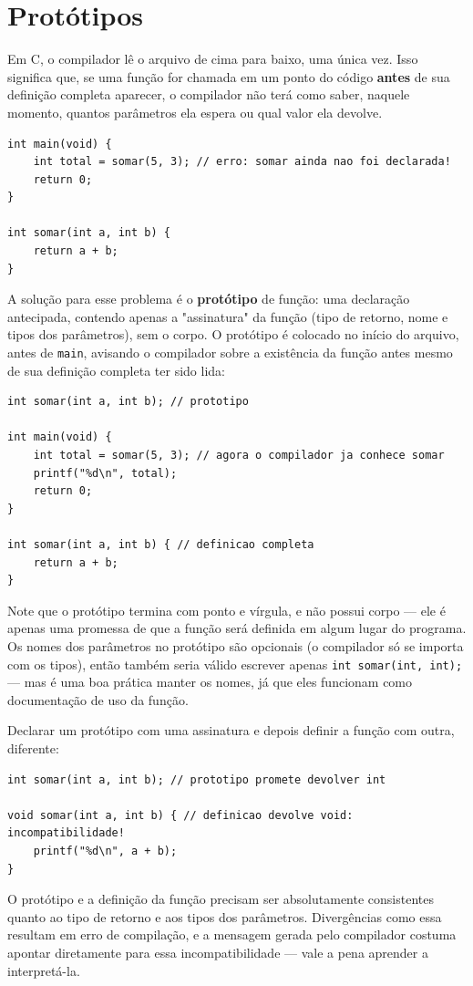 \documentclass[12pt,a4paper,oneside]{extreport}
\begin{document}
\section{Protótipos}

Em C, o compilador lê o arquivo de cima para baixo, uma única vez. Isso significa que, se uma função for chamada em um ponto do código \textbf{antes} de sua definição completa aparecer, o compilador não terá como saber, naquele momento, quantos parâmetros ela espera ou qual valor ela devolve.

\begin{lstlisting}
int main(void) {
    int total = somar(5, 3); // erro: somar ainda nao foi declarada!
    return 0;
}

int somar(int a, int b) {
    return a + b;
}
\end{lstlisting}

A solução para esse problema é o \textbf{protótipo} de função: uma declaração antecipada, contendo apenas a "assinatura" da função (tipo de retorno, nome e tipos dos parâmetros), sem o corpo. O protótipo é colocado no início do arquivo, antes de \texttt{main}, avisando o compilador sobre a existência da função antes mesmo de sua definição completa ter sido lida:

\begin{lstlisting}
int somar(int a, int b); // prototipo

int main(void) {
    int total = somar(5, 3); // agora o compilador ja conhece somar
    printf("%d\n", total);
    return 0;
}

int somar(int a, int b) { // definicao completa
    return a + b;
}
\end{lstlisting}

Note que o protótipo termina com ponto e vírgula, e não possui corpo — ele é apenas uma promessa de que a função será definida em algum lugar do programa. Os nomes dos parâmetros no protótipo são opcionais (o compilador só se importa com os tipos), então também seria válido escrever apenas \texttt{int somar(int, int);} — mas é uma boa prática manter os nomes, já que eles funcionam como documentação de uso da função.

\begin{errocomum}
Declarar um protótipo com uma assinatura e depois definir a função com outra, diferente:
\begin{lstlisting}
int somar(int a, int b); // prototipo promete devolver int

void somar(int a, int b) { // definicao devolve void: incompatibilidade!
    printf("%d\n", a + b);
}
\end{lstlisting}
O protótipo e a definição da função precisam ser absolutamente consistentes quanto ao tipo de retorno e aos tipos dos parâmetros. Divergências como essa resultam em erro de compilação, e a mensagem gerada pelo compilador costuma apontar diretamente para essa incompatibilidade — vale a pena aprender a interpretá-la.
\end{errocomum}
\end{document}
